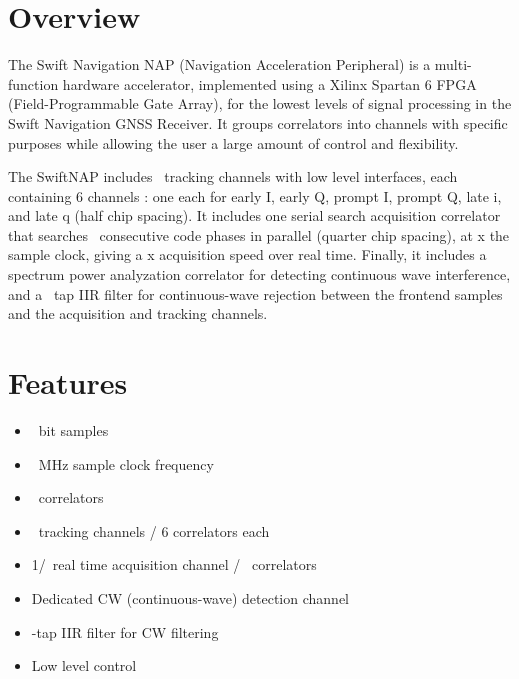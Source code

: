 \documentclass{article}
\begin{document}
\raggedcolumns
\begin{multicols}{2}

\section*{Overview}

The Swift Navigation NAP (Navigation Acceleration Peripheral) is a multi-function hardware accelerator, implemented using a Xilinx Spartan 6 FPGA (Field-Programmable Gate Array), for the lowest levels of signal processing in the Swift Navigation GNSS Receiver. It groups correlators into channels with specific purposes while allowing the user a large amount of control and flexibility.

The SwiftNAP includes \numtrackchans\ tracking channels with low level interfaces, each containing 6 channels : one each for early I, early Q, prompt I, prompt Q, late i, and late q (half chip spacing). It includes one serial search acquisition correlator that searches \acqntaps\ consecutive code phases in parallel (quarter chip spacing), at \acqfreqmult x the sample clock, giving a \acqspeed x acquisition speed over real time. Finally, it includes a spectrum power analyzation correlator for detecting continuous wave interference, and a \iirntaps\ tap IIR filter for continuous-wave rejection between the frontend samples and the acquisition and tracking channels.
\columnbreak

\section*{Features}
\begin{itemize} 
  \bulletnoindent
  \setlength{\itemsep}{4pt}
  \item \samplebits\ bit samples
  \item \feclkfreq\ MHz sample clock frequency
  \item \numcorrelators\ correlators
  \item \numtrackchans\ tracking channels / 6 correlators each
  \item 1/\acqspeed\ real time acquisition channel / \acqntaps\ correlators
  \item Dedicated CW (continuous-wave) detection channel
  \item \iirntaps -tap IIR filter for CW filtering
  \item Low level control
\end{itemize}


\end{multicols}
\end{document}
